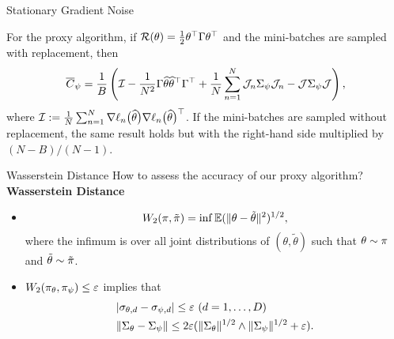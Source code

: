 \documentclass[10pt,xcolor=table]{beamer}
\begin{document}
\begin{frame}{Stationary Gradient Noise}
	\begin{theorem} \label{theorem: general case covariance matrix of noise}
		For the proxy algorithm, if $\mathcal{R}(\theta) = \frac{1}{2} \theta^{\top}\Gamma \theta^{\top}$ and the mini-batches
		are sampled with replacement, then 
		\begin{equation*}
			\label{eq: covariance of stationary noise}
			\begin{aligned}
				\overline{C}_{\psi} =\frac{1}{B} \left( \mathcal{I} - \frac{1}{N^{2}} \Gamma \widehat{\theta} \widehat{\theta}^{\top} \Gamma^{\top} + \frac{1}{N} \sum_{n=1}^{N} \mathcal{J}_{n} \Sigma_{\psi} \mathcal{J}_{n} -  \mathcal{J} \Sigma_{\psi}\mathcal{J} \right),
			\end{aligned} 
		\end{equation*}
		where $\mathcal{I} :=  \frac{1}{N} \sum_{n=1}^{N} \nabla\ell_{n}\bigl(\widehat{\theta}\bigr) \nabla\ell_{n}\bigl(\widehat{\theta}\bigr)^{\top}$.
		If the mini-batches are sampled without replacement, the same result holds but with the right-hand side multiplied by $(N-B)/(N-1)$. 
	\end{theorem}
\end{frame}

\begin{frame}{Wasserstein Distance}
How to assess the accuracy of our proxy algorithm? \textbf{Wasserstein Distance}
\begin{itemize}
\item \[
W_{2}(\pi, \tilde\pi) = \inf \mathbb{E}(\lVert\theta - \tilde\theta\rVert^{2})^{1/2},
\]
where the infimum is over all joint distributions of $(\theta, \tilde\theta)$ such that $\theta \sim \pi$ and $\tilde\theta \sim \tilde\pi$. 
\item $W_{2}(\pi_{\theta}, \pi_{\psi}) \leq \varepsilon$ implies that
\begin{equation*}
	\begin{aligned}
		&\label{eq:general-stdev-and-cov-error-bounds}
		|\sigma_{\theta,d} - \sigma_{\psi,d}| \leq \varepsilon~(d = 1,\dots,D) \\
		&\lVert\Sigma_{\theta} - \Sigma_{\psi}\rVert \le 2 \varepsilon (\lVert\Sigma_{\theta}\rVert^{1/2} \wedge \lVert\Sigma_{\psi}\rVert^{1/2} + \varepsilon).
	\end{aligned}
\end{equation*}
\end{itemize}
\end{frame}
\end{document}
